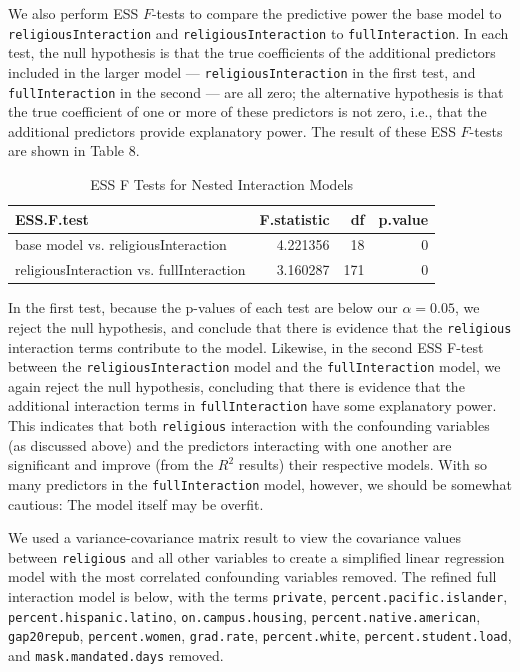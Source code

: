 \documentclass[
]{article}
\begin{document}
We also perform ESS \(F\)-tests to compare the predictive power the base
model to \texttt{religiousInteraction} and \texttt{religiousInteraction}
to \texttt{fullInteraction}. In each test, the null hypothesis is that
the true coefficients of the additional predictors included in the
larger model --- \texttt{religiousInteraction} in the first test, and
\texttt{fullInteraction} in the second --- are all zero; the alternative
hypothesis is that the true coefficient of one or more of these
predictors is not zero, i.e., that the additional predictors provide
explanatory power. The result of these ESS \(F\)-tests are shown in
Table 8.

\begin{table}

\caption{\label{tab:unnamed-chunk-22}ESS F Tests for Nested Interaction Models}
\centering
\begin{tabular}[t]{l|r|r|r}
\hline
ESS.F.test & F.statistic & df & p.value\\
\hline
base model vs. religiousInteraction & 4.221356 & 18 & 0\\
\hline
religiousInteraction vs. fullInteraction & 3.160287 & 171 & 0\\
\hline
\end{tabular}
\end{table}

In the first test, because the p-values of each test are below our
\(\alpha=0.05\), we reject the null hypothesis, and conclude that there
is evidence that the \texttt{religious} interaction terms contribute to
the model. Likewise, in the second ESS F-test between the
\texttt{religiousInteraction} model and the \texttt{fullInteraction}
model, we again reject the null hypothesis, concluding that there is
evidence that the additional interaction terms in
\texttt{fullInteraction} have some explanatory power. This indicates
that both \texttt{religious} interaction with the confounding variables
(as discussed above) and the predictors interacting with one another are
significant and improve (from the \(R^2\) results) their respective
models. With so many predictors in the \texttt{fullInteraction} model,
however, we should be somewhat cautious: The model itself may be
overfit.

We used a variance-covariance matrix result to view the covariance
values between \texttt{religious} and all other variables to create a
simplified linear regression model with the most correlated confounding
variables removed. The refined full interaction model is below, with the
terms \texttt{private}, \texttt{percent.pacific.islander},
\texttt{percent.hispanic.latino}, \texttt{on.campus.housing},
\texttt{percent.native.american}, \texttt{gap20repub},
\texttt{percent.women}, \texttt{grad.rate}, \texttt{percent.white},
\texttt{percent.student.load}, and \texttt{mask.mandated.days} removed.
\end{document}
